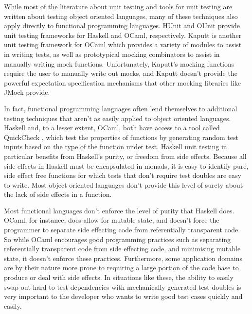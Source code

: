 \documentclass[proposal]{softeng}
\begin{document}

While most of the literature about unit testing and tools for unit
testing are written about testing object oriented languages, many of
these techniques also apply directly to functional programming
languages. HUnit \cite{www:hunit} and OUnit \cite{www:ounit} provide
unit testing frameworks for Haskell and OCaml, respectively. Kaputt
\cite{www:kaputt} is another unit testing framework for OCaml which
provides a variety of modules to assist in writing tests, as well as
prototypical mocking combinators to assist in manually writing mock
functions. Unfortunately, Kaputt's mocking functions require the user
to manually write out mocks, and Kaputt doesn't provide the powerful
expectation specification mechanisms that other mocking libraries like
JMock \cite{www:jmock} provide.

In fact, functional programming languages often lend themselves to
additional testing techniques that aren't as easily applied to object
oriented languages. Haskell and, to a lesser extent, OCaml, both have
access to a tool called QuickCheck \cite{canou:ocaml_random_test}
\cite{claessen:quickcheck}, which test the properties of functions by
generating random test inputs based on the type of the function under
test. Haskell unit testing in particular benefits from Haskell's
purity, or freedom from side effects. Because all side effects in
Haskell must be encapsulated in monads, it is easy to identify pure,
side effect free functions for which tests that don't require test
doubles are easy to write. Most object oriented languages don't
provide this level of surety about the lack of side effects in a
function.


Most functional languages don't enforce the level of purity that
Haskell does. OCaml, for instance, does allow for mutable state, and
doesn't force the programmer to separate side effecting code from
referentially transparent code. So while OCaml encourages good
programming practices such as separating referentially transparent
code from side effecting code, and minimising mutable state, it
doesn't enforce these practices. Furthermore, some application domains
are by their nature more prone to requiring a large portion of the
code base to produce or deal with side effects. In situations like
these, the ability to easily swap out hard-to-test dependencies with
mechanically generated test doubles is very important to the
developer who wants to write good test cases quickly and easily.
\end{document}
